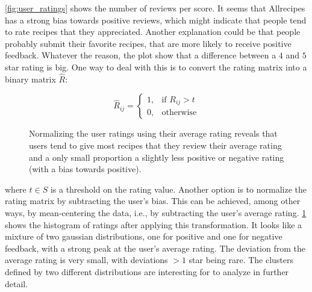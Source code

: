 \cref{fig:user_ratings} shows the number of reviews per score.
It seems that Allrecipes has a strong bias towards positive reviews, which might indicate that people tend to rate recipes that they appreciated.
Another explanation could be that people probably submit their favorite recipes, that are more likely to receive positive feedback.
Whatever the reason, the plot show that a difference between a $4$ and $5$ star rating is big.
One way to deal with this is to convert the rating matrix into a binary matrix $\hat{R}$:

\begin{equation*}
	\tag{Binary Rating matrix}
	\hat{R}_{ij}=
	\begin{cases}
	    1,& \text{if } R_{ij}>t \\
	    0,& \text{otherwise}
	\end{cases}
\end{equation*}

\begin{figure}[htbp]
	\centering
	
	\caption{Normalizing the user ratings using their average rating reveals that users tend to give most recipes that they review their average rating and a only small proportion a slightly less positive or negative rating (with a bias towards positive).}
	\label{fig:normalized_ratings}
\end{figure}

\noindent where $t \in S$ is a threshold on the rating value.
Another option is to normalize the rating matrix by subtracting the user's bias.
This can be achieved, among other ways, by mean-centering the data, i.e., by subtracting the user's average rating.
\cref{fig:normalized_ratings} shows the histogram of ratings after applying this transformation.
It looks like a mixture of two gaussian distributions, one for positive and one for negative feedback, with a strong peak at the user's average rating.
The deviation from the average rating is very small, with deviations $>1$ star being rare.
The clusters defined by two different distributions are interesting for to analyze in further detail.